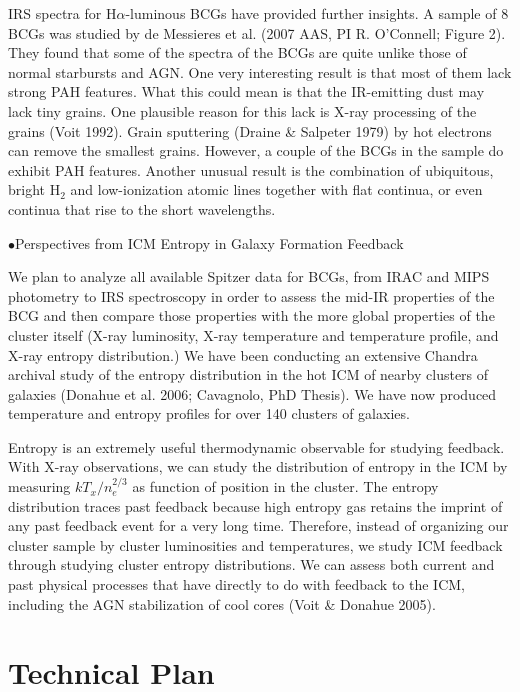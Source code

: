 \documentclass[letterpaper,12pt]{article}
\begin{document}
IRS spectra for H$\alpha$-luminous
BCGs have provided further insights. A sample of 8 BCGs was studied by de Messieres et al. (2007 AAS, PI R. O'Connell;
Figure 2).
They found that some of the spectra of the BCGs are quite unlike those of normal starbursts
and AGN. One very interesting result is that most of them lack strong PAH features. 
What this could mean is that the IR-emitting dust may lack tiny grains. One plausible
reason for this lack is X-ray processing of the grains (Voit 1992). Grain sputtering (Draine \& Salpeter 1979)
by hot electrons can remove the smallest grains. However, a couple of the BCGs in the
sample do exhibit PAH features. Another unusual result is the combination of ubiquitous,
bright H$_2$ and low-ionization atomic lines together with flat continua, or even
continua that rise to the short wavelengths. 

\vspace{0.5cm}\noindent$\bullet${\sc Perspectives from ICM Entropy in Galaxy Formation Feedback}

We plan to analyze all available Spitzer data for BCGs, from IRAC and MIPS photometry to 
IRS spectroscopy in order to assess the mid-IR properties of the BCG and then compare those
properties with the more global properties of the cluster itself (X-ray luminosity, X-ray
temperature and temperature profile, and X-ray entropy distribution.) 
We have been conducting an extensive Chandra archival study of the entropy distribution in
the hot ICM of nearby clusters of galaxies (Donahue et al. 2006; Cavagnolo, PhD Thesis). We 
have now produced temperature and entropy profiles for over 140 clusters of galaxies.

Entropy is an extremely useful thermodynamic observable for studying feedback. With X-ray observations, we can 
study the distribution of entropy in the ICM by measuring $kT_x / n_e^{2/3}$ as function of position
in the cluster. The entropy distribution traces past feedback because high entropy
gas retains the imprint of any past feedback event for a very long time. 
Therefore, instead of organizing our cluster sample  by cluster luminosities and temperatures, we 
study ICM feedback through studying cluster 
entropy distributions. We can assess both current and past physical processes 
that have directly to do with feedback to the ICM, including the AGN stabilization of cool cores
(Voit \& Donahue 2005).


\section{Technical Plan}
\end{document}
